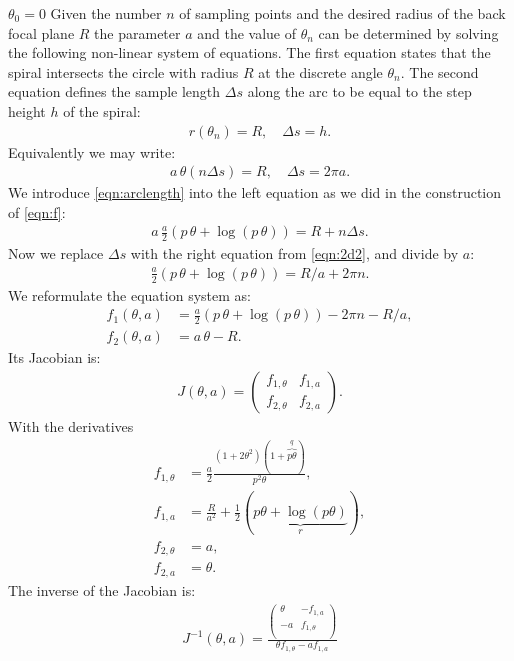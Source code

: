\documentclass[twocolumn,DIV18]{scrartcl}
\renewcommand{\(}{\left(}
\renewcommand{\)}{\right)}
\begin{document}
  $\theta_0=0$ Given the
number $n$ of sampling points and the desired radius of the back focal
plane $R$ the parameter $a$ and the value of $\theta_n$ can be
determined by solving the following non-linear system of
equations. The first equation states that the spiral intersects the
circle with radius $R$ at the discrete angle $\theta_n$. The second
equation defines the sample length $\Delta s$ along the arc to be
equal to the step height $h$ of the spiral:
\begin{align}
  r(\theta_n)=R, \quad \Delta s=h.
\end{align}
Equivalently we may write:
\begin{align} \label{eqn:2d2}
  a \, \theta(n \Delta s)=R, \quad \Delta s=2\pi a.
\end{align}
We introduce \eqref{eqn:arclength} into the left equation as we did in
the construction of \eqref{eqn:f}:
\begin{align}
  a \, \frac{a}{2} \(p\,\theta+\log(p\,\theta)\) = R+n\Delta s. 
\end{align}
Now we replace $\Delta s$ with the right equation from
\eqref{eqn:2d2}, and divide by $a$:
\begin{align}
  \frac{a}{2} \(p\,\theta+\log(p\,\theta)\) = R/a +2\pi n. 
\end{align}
We reformulate the equation system as:
\begin{align}
  f_1(\theta,a)&=\frac{a}{2}
  \(p\,\theta+\log(p\,\theta)\)
  -2\pi n-R/a,\\
  f_2(\theta,a)&=a\,\theta-R. 
\end{align}
Its Jacobian is:
\begin{align}
  J(\theta,a)=\begin{pmatrix}
  f_{1,\theta} & f_{1,a} \\
  f_{2,\theta} & f_{2,a}
\end{pmatrix}.
\end{align}
With the derivatives
\begin{align}
  f_{1,\theta}&=\frac{a}{2}\frac{(1+2\theta^2)(1+\overbrace{p \theta}^q)}
  {p^2 \theta},\\ 
  f_{1,a}&=\frac{R}{a^2}+\frac{1}{2}(\underbrace{p\theta+\log(p\theta)}_r), \\
  f_{2,\theta}&=a, \\
  f_{2,a}&=\theta.
\end{align}
The inverse of the Jacobian is:
\begin{align}
J^{-1}(\theta,a)=\frac{\begin{pmatrix}
    \theta & -f_{1,a} \\
    -a & f_{1,\theta}\\
\end{pmatrix}}
{\theta f_{1,\theta}-a f_{1,a}}
\end{align}
\end{document}
